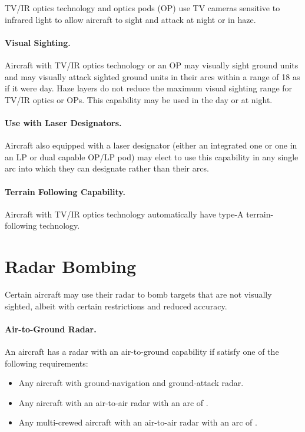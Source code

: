 \begin{advancedrules}
{TV/IR optics technology and optics pods (OP) use TV cameras sensitive to infrared light to allow aircraft to sight and attack at night or in haze.

\paragraph{Visual Sighting.} Aircraft with TV/IR optics technology or an OP may visually sight ground units and may visually attack sighted ground units in their  arcs within a range of 18 as if it were day. Haze layers do not reduce the maximum visual sighting range for TV/IR optics or OPs. This capability may be used in the day or at night. 

\paragraph{Use with Laser Designators.} Aircraft also equipped with a laser designator (either an integrated one or one in an LP or dual capable OP/LP pod) may elect to use this capability in any single arc into which they can designate rather than their  arcs.

\paragraph{Terrain Following Capability.} Aircraft with TV/IR optics technology automatically have type-A terrain-following technology.

\section{Radar Bombing}

Certain aircraft may use their radar to bomb targets that are not visually sighted, albeit with certain restrictions and reduced accuracy.

\paragraph{Air-to-Ground Radar.} An aircraft has a radar with an air-to-ground capability if satisfy one of the following requirements: 
\begin{itemize}
\item Any aircraft with ground-navigation and ground-attack radar.
\item Any aircraft with an air-to-air radar with an arc of .
\item Any multi-crewed aircraft with an air-to-air radar with an arc of .
\end{itemize}

}
\end{advancedrules}

